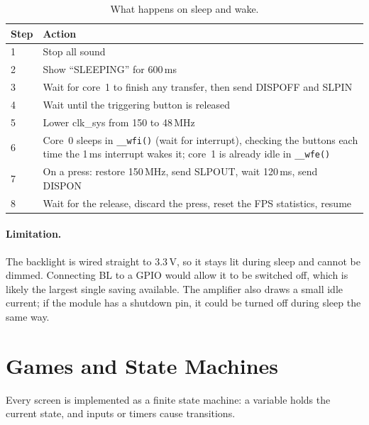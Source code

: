 \documentclass[11pt,a4paper]{article}
\begin{document}
\begin{table}[H]
\centering
\caption{What happens on sleep and wake.}
\begin{tabularx}{\linewidth}{lX}
\toprule
\textbf{Step} & \textbf{Action} \\
\midrule
1 & Stop all sound \\
2 & Show ``SLEEPING'' for 600\,ms \\
3 & Wait for core~1 to finish any transfer, then send DISPOFF and SLPIN \\
4 & Wait until the triggering button is released \\
5 & Lower clk\_sys from 150 to 48\,MHz \\
6 & Core~0 sleeps in \texttt{\_\_wfi()} (wait for interrupt), checking the buttons each time the 1\,ms interrupt wakes it; core~1 is already idle in \texttt{\_\_wfe()} \\
7 & On a press: restore 150\,MHz, send SLPOUT, wait 120\,ms, send DISPON \\
8 & Wait for the release, discard the press, reset the FPS statistics, resume \\
\bottomrule
\end{tabularx}
\end{table}

\paragraph{Limitation.} The backlight is wired straight to 3.3\,V, so it stays
lit during sleep and cannot be dimmed. Connecting BL to a GPIO would allow it to
be switched off, which is likely the largest single saving available. The
amplifier also draws a small idle current; if the module has a shutdown pin, it
could be turned off during sleep the same way.

\section{Games and State Machines}\label{sec:games}

Every screen is implemented as a finite state machine: a variable holds the
current state, and inputs or timers cause transitions.
\end{document}

